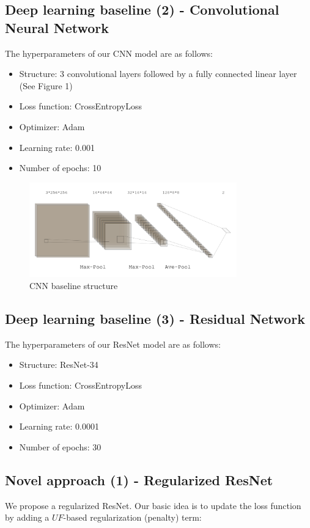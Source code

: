 \subsection{Deep learning baseline (2) -  Convolutional Neural Network}
The hyperparameters of our CNN model are as follows:
\begin{itemize}
    \item Structure: 3 convolutional layers followed by a fully connected linear layer (See Figure 1)
    \item Loss function: CrossEntropyLoss
    \item Optimizer: Adam
    \item Learning rate: 0.001
    \item Number of epochs: 10
\end{itemize}

\begin{figure}[H]
	\centering
	\includegraphics[width=0.8\textwidth]{figure/CNN.png}
	\caption{CNN baseline structure}
	\label{fig: cnn-structure}
\end{figure}


\subsection{Deep learning baseline (3) - Residual Network}
The hyperparameters of our ResNet model are as follows:

\begin{itemize}
    \item Structure: ResNet-34
    \item Loss function: CrossEntropyLoss
    \item Optimizer: Adam
    \item Learning rate: 0.0001
    \item Number of epochs: 30
\end{itemize}

\subsection{Novel approach (1) - Regularized ResNet}
We propose a regularized ResNet. Our basic idea is to update the loss function by adding a $UF$-based regularization (penalty) term:

